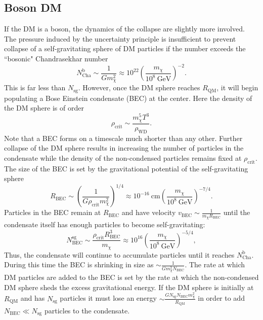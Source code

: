 \documentclass[preprintnumbers,amsmath,amssymb,prd,superscriptaddress]{revtex4}
\newcommand{\GeV}{\text{GeV}}
\newcommand{\cm}{\text{cm}}
\def\r{\right)}
\def\l{\left(}
\begin{document}
\subsection{Boson DM}
If the DM is a boson, the dynamics of the collapse are slightly more involved.
The pressure induced by the uncertainty principle is insufficient to prevent collapse of a self-gravitating sphere of DM particles if the number exceeds the
 ``bosonic" Chandrasekhar number
\begin{equation}
\label{eq:boscha}
N^\text{b}_\text{Cha} \sim \frac{1}{G m_\chi^2} \approx 10^{22}  \l \frac{m_\chi}{10^{8} ~\GeV}\r^{-2}.
\end{equation}
This is far less than $N_\text{sg}$. 
However, once the DM sphere reaches $R_\text{QM}$, it will begin populating a Bose Einstein condensate (BEC) at the center.
Here the density of the DM sphere is of order
\begin{equation}
\rho_\text{crit} \sim \frac{m_\chi^5 T^3}{\rho_\text{WD}}.
\end{equation}
Note that a BEC forms on a timescale much shorter than any other.
Further collapse of the DM sphere results in increasing the number of particles in the condensate while the density of the non-condensed particles remains fixed at $\rho_\text{crit}$. 
The size of the BEC is set by the gravitational potential of the self-gravitating sphere
\begin{equation}
R_\text{BEC} \sim \l \frac{1}{G \rho_\text{crit} m_\chi^2}\r^{1/4} \approx 10^{-16} ~\cm \l \frac{m_\chi}{10^{8} ~\GeV} \r^{-7/4}.
\end{equation}
Particles in the BEC remain at $R_\text{BEC}$ and have velocity $v_\text{BEC} \sim \frac{1}{m_\chi R_\text{BEC}}$ until the condensate itself has enough particles to become self-gravitating: 
\begin{equation}
N^\text{sg}_\text{BEC} \sim \frac{\rho_\text{crit} R_\text{BEC}^3}{m_\chi} \approx 10^{16} \l \frac{m_\chi}{10^{8} ~\GeV} \r^{-5/4},
\end{equation}
Thus, the condensate will continue to accumulate particles until it reaches $N^\text{b}_\text{Cha}$. 
During this time the BEC is shrinking in size as $\sim \frac{1}{G m_\chi^3 N_\text{BEC}}$.
The rate at which DM particles are added to the BEC is set by the rate at which the non-condensed DM sphere sheds the excess gravitational energy.
If the DM sphere is initially at $R_\text{QM}$ and has $N_\text{sg}$ particles it must lose an energy $\sim \frac{G N_\text{sg} N_\text{BEC} m_\chi^2}{R_\text{QM}}$ in order to add $N_\text{BEC} \ll N_\text{sg}$ particles to the condensate. 
\end{document}
